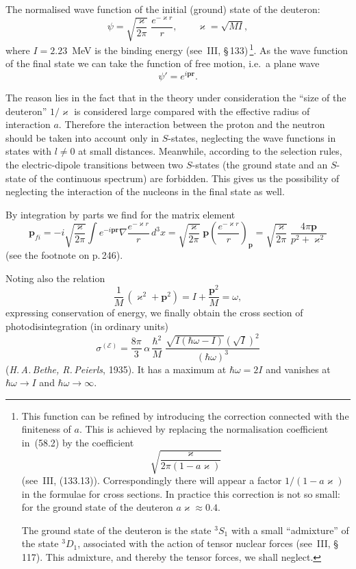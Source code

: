 The normalised wave function of the initial (ground) state of the deuteron:
\begin{equation}
\psi = \sqrt{\frac{\varkappa}{2\pi}}\;\frac{e^{-\varkappa r}}{r},\qquad \varkappa = \sqrt{MI},
\tag{58.2}
\end{equation}
where $I = 2.23$~MeV is the binding energy (see~III, \S\,133)\,\footnote{This function can be refined by introducing the correction connected with the finiteness of $a$. This is achieved by replacing the normalisation coefficient in~(58.2) by the coefficient
\[
\sqrt{\frac{\varkappa}{2\pi(1-a\varkappa)}}
\]
(see~III, (133.13)). Correspondingly there will appear a factor $1/(1-a\varkappa)$ in the formulae for cross sections. In practice this correction is not so small: for the ground state of the deuteron $a\varkappa \approx 0.4$.

The ground state of the deuteron is the state $^3S_1$ with a small ``admixture'' of the state $^3D_1$, associated with the action of tensor nuclear forces (see~III, \S\,117). This admixture, and thereby the tensor forces, we shall neglect.}. As the wave function of the final state we can take the function of free motion, i.e.\ a plane wave
\begin{equation}
\psi' = e^{i\mathbf{p}\mathbf{r}}.
\tag{58.3}
\end{equation}

The reason lies in the fact that in the theory under consideration the ``size of the deuteron'' $1/\varkappa$ is considered large compared with the effective radius of interaction $a$. Therefore the interaction between the proton and the neutron should be taken into account only in $S$-states, neglecting the wave functions in states with $l \neq 0$ at small distances. Meanwhile, according to the selection rules, the electric-dipole transitions between two $S$-states (the ground state and an $S$-state of the continuous spectrum) are forbidden. This gives us the possibility of neglecting the interaction of the nucleons in the final state as well.

By integration by parts we find for the matrix element
\[
\mathbf{p}_{fi} = -i\sqrt{\frac{\varkappa}{2\pi}}\int e^{-i\mathbf{p}\mathbf{r}}\nabla\frac{e^{-\varkappa r}}{r}\,d^3x = \sqrt{\frac{\varkappa}{2\pi}}\;\mathbf{p}\left(\frac{e^{-\varkappa r}}{r}\right)_{\!\mathbf{p}} = \sqrt{\frac{\varkappa}{2\pi}}\;\frac{4\pi\mathbf{p}}{p^2+\varkappa^2}
\]
(see the footnote on p.\,246).

Noting also the relation
\[
\frac{1}{M}\,(\varkappa^2 + \mathbf{p}^2) = I + \frac{\mathbf{p}^2}{M} = \omega,
\]
expressing conservation of energy, we finally obtain the cross section of photodisintegration (in ordinary units)
\begin{equation}
\sigma^{(\mathscr{E})} = \frac{8\pi}{3}\,\alpha\,\frac{\hbar^2}{M}\;\frac{\sqrt{I(\hbar\omega - I)}(\sqrt{I})^2}{(\hbar\omega)^3}
\tag{58.4}
\end{equation}
(\textit{H.\,A.\,Bethe, R.\,Peierls}, 1935). It has a maximum at $\hbar\omega = 2I$ and vanishes at $\hbar\omega \to I$ and $\hbar\omega \to \infty$.

